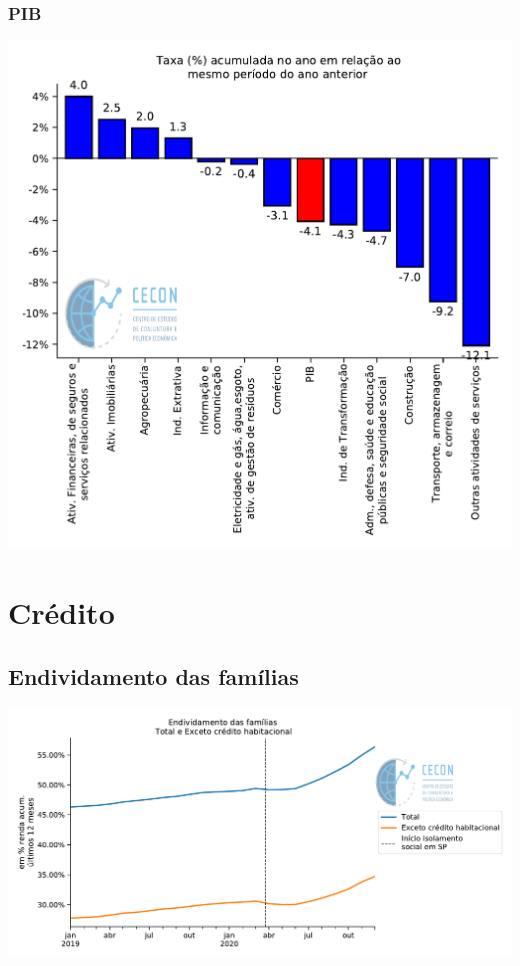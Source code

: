\documentclass{SelfArx}
\begin{document}
\subsubsection*{PIB}
\label{sec:org2be222b}

\begin{center}
\includegraphics[width=.9\linewidth]{./figs/PIB/PIB_Acum.pdf}
\end{center}

\section*{Crédito}
\label{sec:org59fa7f7}

\subsection*{Endividamento das famílias}
\label{sec:org98f5a96}

\begin{center}
\includegraphics[width=.9\linewidth]{./figs/Credito/EndividamentoFamilias.pdf}
\end{center}
\end{document}

